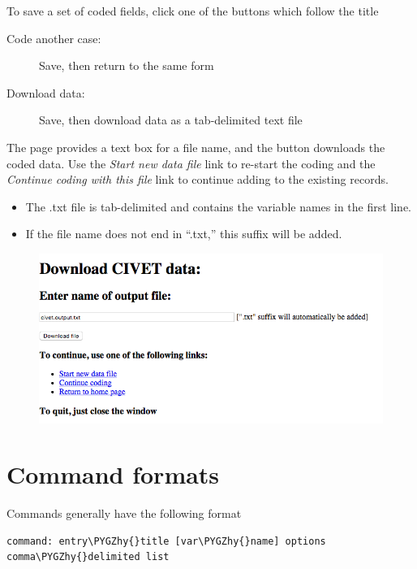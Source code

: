 \documentclass[letterpaper,10pt,english]{sphinxmanual}
\def\PYGZhy{\char`\-}
\begin{document}
To save a set of coded fields, click one of the buttons which follow the
title 
\begin{description}
\item[{Code another case:}] \leavevmode
Save, then return to the same form

\item[{Download data:}] \leavevmode
Save, then download data as a tab-delimited text file

\end{description}

The  page  provides a
text box for a file name, and the  button downloads the
coded data. Use the \emph{Start new data file} link to re-start the coding
and the \emph{Continue coding with this file} link to continue adding to the
existing records.
\begin{itemize}
\item {} 
The .txt file is tab-delimited and contains the variable names in the
first line.

\item {} 
If the file name does not end in “.txt,” this suffix will be added.

\end{itemize}
\begin{figure}[htbp]
\centering

\includegraphics{download.png}
\end{figure}


\section{Command formats}
\label{forms:command-formats}
Commands generally have the following format

\begin{Verbatim}[commandchars=\\\{\}]
command: entry\PYGZhy{}title [var\PYGZhy{}name] options
comma\PYGZhy{}delimited list
\end{Verbatim}
\end{document}
